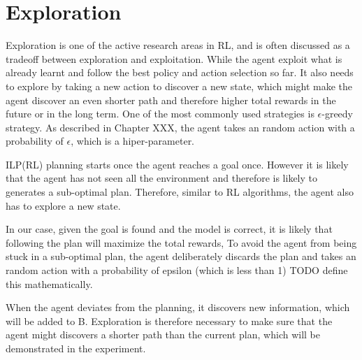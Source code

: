 





\section{Exploration}
\label{exploration}
Exploration is one of the active research areas in RL, and is often discussed as a tradeoff between exploration and exploitation. 
While the agent exploit what is already learnt and follow the best policy and action selection so far.
It also needs to explore by taking a new action to discover a new state, which might make the agent discover an even shorter path and therefore higher total rewards in the future or in the long term. 
One of the most commonly used strategies is $\epsilon$-greedy strategy. 
As described in Chapter XXX, the agent takes an random action with a probability of $\epsilon$, which is a hiper-parameter.

ILP(RL) planning starts once the agent reaches a goal once. However it is likely that the agent has not seen all the environment
and therefore is likely to generates a sub-optimal plan. Therefore, similar to RL algorithms, the agent also has to explore a new state.

In our case, given the goal is found and the model is correct, it is likely that following the plan will maximize the total rewards, 
To avoid the agent from being stuck in a sub-optimal plan, the agent deliberately discards the plan and takes an random action with a probability of
epsilon (which is less than 1) TODO define this mathematically.

When the agent deviates from the planning, it discovers new information, which will be added to B.
Exploration is therefore necessary to make sure that the agent might discovers a shorter path than the current plan, which will be demonstrated in the experiment.

